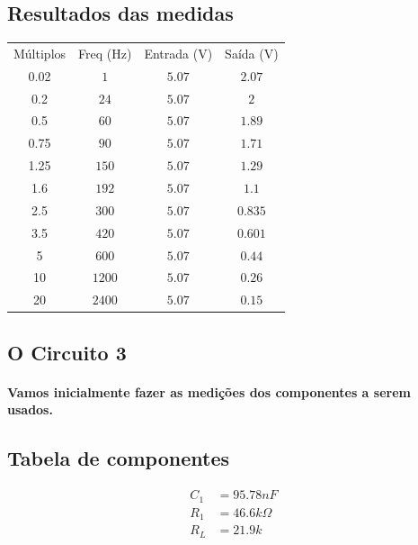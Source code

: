 \documentclass[12pt,twoside, a4paper, twocolumn]{article}
\begin{document}
\subsection{Resultados das medidas}
\begin{center}
    \begin{tabular}{ |c|c|c|c| }
        \hline
        Múltiplos & Freq (Hz) & Entrada (V) & Saída (V) \\
        0.02      & $1$       & $5.07$      & $2.07$    \\
        0.2       & $24$      & $5.07$      & $2$       \\
        0.5       & $60$      & $5.07$      & $1.89$    \\
        0.75      & $90$      & $5.07$      & $1.71$    \\
        1.25      & $150$     & $5.07$      & $1.29$    \\
        1.6       & $192$     & $5.07$      & $1.1$     \\
        2.5       & $300$     & $5.07$      & $0.835$   \\
        3.5       & $420$     & $5.07$      & $0.601$   \\
        5         & $600$     & $5.07$      & $0.44$    \\
        10        & $1200$    & $5.07$      & $0.26$    \\
        20        & $2400$    & $5.07$      & $0.15$    \\
        \hline
    \end{tabular}
\end{center}


\newpage


\subsection{O Circuito 3}


\paragraph{Vamos inicialmente fazer as medições dos componentes a serem usados.}


\subsection{Tabela de componentes}


\begin{equation*}
    \begin{aligned}
        C_1 & = 95.78nF         \\
        R_1 & = 46.6k \varOmega \\
        R_L & = 21.9k
    \end{aligned}
\end{equation*}
\end{document}
